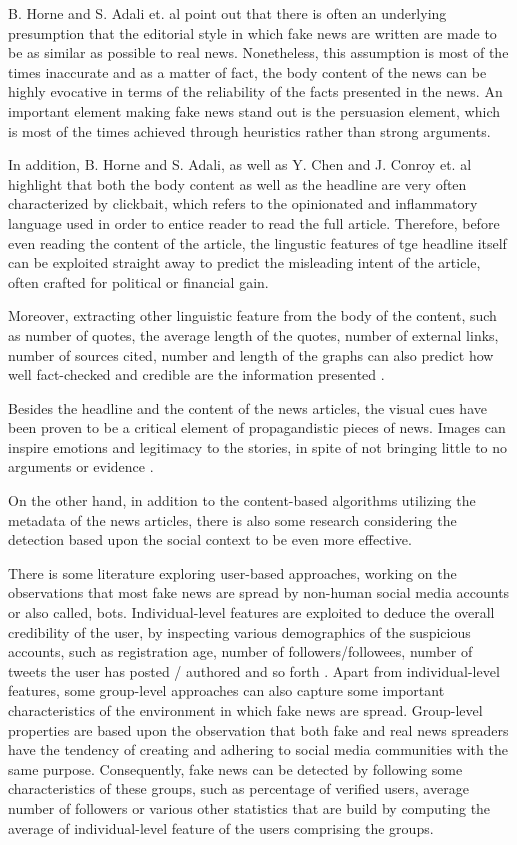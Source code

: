 \documentclass[12pt, a4paper]{article}
\begin{document}
    B. Horne and S. Adali et. al \cite{a13} point out that there is often an underlying presumption that the editorial style in which fake news are written are made to be as similar as possible to real news. Nonetheless, this assumption is most of the times inaccurate and as a matter of fact, the body content of the news can be highly evocative in terms of the reliability of the facts presented in the news. An important element making fake news stand out is the persuasion element, which is most of the times achieved through heuristics rather than strong arguments.

    In addition, B. Horne and S. Adali, as well as Y. Chen and J. Conroy et. al \cite{a14} highlight that both the body content as well as the headline are very often characterized by clickbait, which refers to the opinionated and inflammatory language used in order to entice reader to read the full article. Therefore, before even reading the content of the article, the lingustic features of tge headline itself can be exploited straight away to predict the misleading intent of the article, often crafted for political or financial gain.

    Moreover, extracting other linguistic feature from the body of the content, such as number of quotes, the average length of the quotes, number of external links, number of sources cited, number and length of the graphs can also predict how well fact-checked and credible are the information presented \cite{a15}.
    
    Besides the headline and the content of the news articles, the visual cues have been proven to be a critical element of propagandistic pieces of news. Images can inspire emotions and legitimacy to the stories, in spite of not bringing little to no arguments or evidence \cite{visual_cues}.

    On the other hand, in addition to the content-based algorithms utilizing the metadata of the news articles, there is also some research considering the detection based upon the social context to be even more effective.

    There is some literature exploring user-based approaches, working on the observations that most fake news are spread by non-human social media accounts or also called, bots. Individual-level features are exploited to deduce the overall credibility of the user, by inspecting various demographics of the suspicious accounts, such as registration age, number of followers/followees, number of tweets the user has posted / authored and so forth \cite{a16}. Apart from individual-level features, some group-level approaches can also capture some important characteristics of the environment in which fake news are spread. Group-level properties are based upon the observation that both fake and real news spreaders have the tendency of creating and adhering to social media communities with the same purpose. Consequently, fake news can be detected by following some characteristics of these groups, such as  percentage of verified users, average number of followers or various other statistics that are build by computing the average of individual-level feature of the users comprising the groups.  
  
\end{document}
